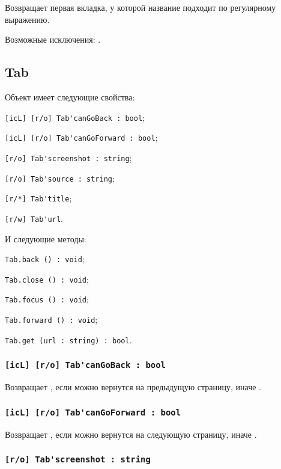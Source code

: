 Возвращает первая вкладка, у которой название подходит по регулярному выражению.

Возможные исключения: .

\subsection{{\color{orange} Tab}}

Объект \tab{} имеет следующие свойства:
\begin{icItems}
	\item \lstinline|[icL] [r/o] Tab'canGoBack : bool|;
	\item \lstinline|[icL] [r/o] Tab'canGoForward : bool|;
	\item \lstinline|[r/o] Tab'screenshot : string|;
	\item \lstinline|[r/o] Tab'source : string|;
	\item \lstinline|[r/*] Tab'title|;
	\item \lstinline|[r/w] Tab'url|.
\end{icItems}

И следующие методы:
\begin{icItems}
	\item \lstinline|Tab.back () : void|;
	\item \lstinline|Tab.close () : void|;
	\item \lstinline|Tab.focus () : void|;
	\item \lstinline|Tab.forward () : void|;
	\item \lstinline|Tab.get (url : string) : bool|.
\end{icItems}

\subsubsection{\lstinline|[icL] [r/o] Tab'canGoBack : bool|}

Возвращает \true, если можно вернутся на предыдущую страницу, иначе \false.

\subsubsection{\lstinline|[icL] [r/o] Tab'canGoForward : bool|}

Возвращает \true, если можно вернутся на следующую страницу, иначе \false.

\subsubsection{\lstinline|[r/o] Tab'screenshot : string|}

